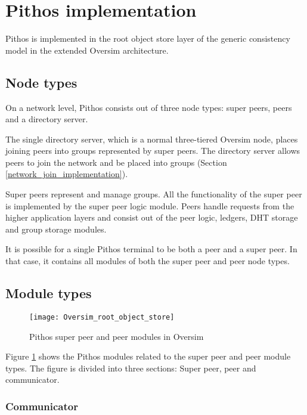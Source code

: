 \section{Pithos implementation}

Pithos is implemented in the root object store layer of the generic consistency model in the extended Oversim architecture.

\subsection{Node types}
\label{pithos_node_types}

On a network level, Pithos consists out of three node types: super peers, peers and a directory server.

The single directory server, which is a normal three-tiered Oversim node, places joining peers into groups represented by super peers. The directory server allows peers to join the network and be placed into groups (Section \ref{network_join_implementation}).

Super peers represent and manage groups. All the functionality of the super peer is implemented by the super peer logic module. Peers handle requests from the higher application layers and consist out of the peer logic, ledgers, DHT storage and group storage modules.

It is possible for a single Pithos terminal to be both a peer and a super peer. In that case, it contains all modules of both the super peer and peer node types.

\subsection{Module types}
\label{pithos_module_types}

\begin{figure}[htbp]
 \centering
 \texttt{[image: Oversim\_root\_object\_store]}
 \caption{Pithos super peer and peer modules in Oversim}
 \label{fig_oversim_root_object_store}
\end{figure}
%
Figure \ref{fig_oversim_root_object_store} shows the Pithos modules related to the super peer and peer module types. The figure is divided into three sections: Super peer, peer and communicator.

\subsubsection{Communicator}

